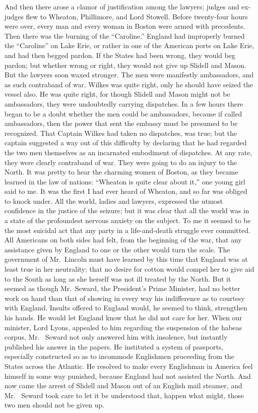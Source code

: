 And then there arose a clamor of justification among the lawyers;
judges and ex-judges flew to Wheaton, Phillimore, and Lord Stowell.
Before twenty-four hours were over, every man and every woman in
Boston were armed with precedents.  Then there was the burning of
the ``Caroline.''  England had improperly burned the ``Caroline'' on
Lake Erie, or rather in one of the American ports on Lake Erie, and
had then begged pardon.  If the States had been wrong, they would
beg pardon; but whether wrong or right, they would not give up
Slidell and Mason.  But the lawyers soon waxed stronger.  The men
were manifestly ambassadors, and as such contraband of war.  Wilkes
was quite right, only he should have seized the vessel also.  He
was quite right, for though Slidell and Mason might not be
ambassadors, they were undoubtedly carrying dispatches.  In a few
hours there began to be a doubt whether the men could be
ambassadors, because if called ambassadors, then the power that
sent the embassy must be presumed to be recognized.  That Captain
Wilkes had taken no dispatches, was true; but the captain suggested
a way out of this difficulty by declaring that he had regarded the
two men themselves as an incarnated embodiment of dispatches.  At
any rate, they were clearly contraband of war.  They were going to
do an injury to the North.  It was pretty to hear the charming
women of Boston, as they became learned in the law of nations:
``Wheaton is quite clear about it,'' one young girl said to me.  It
was the first I had ever heard of Wheaton, and so far was obliged
to knock under.  All the world, ladies and lawyers, expressed the
utmost confidence in the justice of the seizure; but it was clear
that all the world was in a state of the profoundest nervous
anxiety on the subject.  To me it seemed to be the most suicidal
act that any party in a life-and-death struggle ever committed.
All Americans on both sides had felt, from the beginning of the
war, that any assistance given by England to one or the other would
turn the scale.  The government of Mr.\ Lincoln must have learned by
this time that England was at least true in her neutrality; that no
desire for cotton would compel her to give aid to the South as long
as she herself was not ill treated by the North.  But it seemed as
though Mr.\ Seward, the President's Prime Minister, had no better
work on hand than that of showing in every way his indifference as
to courtesy with England.  Insults offered to England would, he
seemed to think, strengthen his hands.  He would let England know
that he did not care for her.  When our minister, Lord Lyons,
appealed to him regarding the suspension of the habeas corpus, Mr.\ %
Seward not only answered him with insolence, but instantly
published his answer in the papers.  He instituted a system of
passports, especially constructed so as to incommode Englishmen
proceeding from the States across the Atlantic.  He resolved to
make every Englishman in America feel himself in some way punished,
because England had not assisted the North.  And now came the
arrest of Slidell and Mason out of an English mail steamer, and Mr.\ %
Seward took care to let it be understood that, happen what might,
those two men should not be given up.

